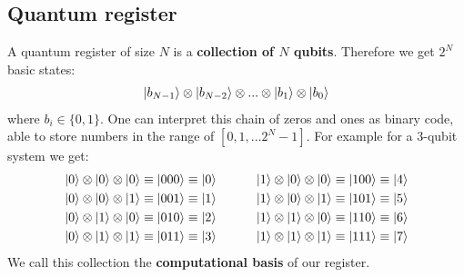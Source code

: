 \documentclass[bibliography=totocnumbered]{article}
\theoremstyle{NoticeStyle}
\begin{document}
\subsection{Quantum register}\label{sec:Quantum register}
A quantum register of size $N$ is a \textbf{collection of $N$ qubits}. Therefore we get $2^N$ basic states:
%
\begin{align}
	\ket{b_{N-1}} \otimes \ket{b_{N-2}} \otimes ... \otimes \ket{b_1} \otimes \ket{b_0}
\end{align}
%
where $b_i \in \{0, 1\}$. One can interpret this chain of zeros and ones as binary code, able to store numbers in the range of $[0, 1, ... 2^N-1]$. For example for a 3-qubit system we get:
%
\begin{align*}
	\ket{0} \otimes \ket{0} \otimes \ket{0} \equiv \ket{000} \equiv \ket{0} \quad\quad\quad
	\ket{1} \otimes \ket{0} \otimes \ket{0} \equiv \ket{100} \equiv \ket{4}\\
	\ket{0} \otimes \ket{0} \otimes \ket{1} \equiv \ket{001} \equiv \ket{1} \quad\quad\quad
	\ket{1} \otimes \ket{0} \otimes \ket{1} \equiv \ket{101} \equiv \ket{5}\\
	\ket{0} \otimes \ket{1} \otimes \ket{0} \equiv \ket{010} \equiv \ket{2} \quad\quad\quad
	\ket{1} \otimes \ket{1} \otimes \ket{0} \equiv \ket{110} \equiv \ket{6}\\
	\ket{0} \otimes \ket{1} \otimes \ket{1} \equiv \ket{011} \equiv \ket{3} \quad\quad\quad
	\ket{1} \otimes \ket{1} \otimes \ket{1} \equiv \ket{111} \equiv \ket{7}
\end{align*}
%
We call this collection the \textbf{computational basis} of our register.
\end{document}
